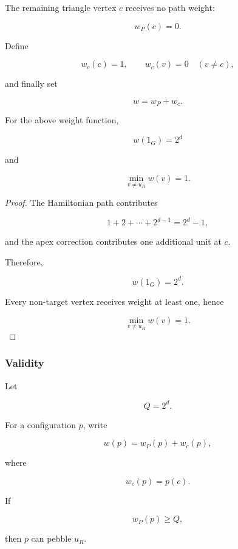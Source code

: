 The remaining triangle vertex $c$ receives no path weight:

\[
w_P(c)=0 .
\]


Define

\[
w_c(c)=1,\qquad w_c(v)=0\quad(v\neq c),
\]

and finally set

\[
w=w_P+w_c .
\]


\begin{lemma}[Normalization]
\label{lem:w-normalization}

For the above weight function,

\[
w(1_G)=2^d
\]

and

\[
\min_{v\neq u_R}w(v)=1 .
\]

\end{lemma}


\begin{proof}

The Hamiltonian path contributes

\[
1+2+\cdots+2^{d-1}=2^d-1,
\]

and the apex correction contributes one additional unit at $c$.

Therefore,

\[
w(1_G)=2^d .
\]

Every non-target vertex receives weight at least one, hence

\[
\min_{v\neq u_R}w(v)=1 .
\]

\end{proof}




\subsubsection{Validity}


Let

\[
Q=2^d .
\]

For a configuration $p$, write

\[
w(p)=w_P(p)+w_c(p),
\]

where

\[
w_c(p)=p(c).
\]



\begin{lemma}
\label{lem:path-case}

If

\[
w_P(p)\ge Q,
\]

then $p$ can pebble $u_R$.

\end{lemma}


